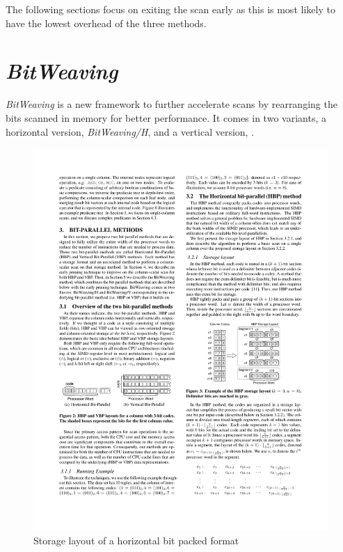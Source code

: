 The following sections focus on exiting the scan early as this is most likely to
have the lowest overhead of the three methods.

\section{\emph{BitWeaving}}

\emph{BitWeaving} \cite{BitWeaving} is a new framework to further accelerate
scans by rearranging the bits scanned in memory for better performance. It comes
in two variants, a horizontal version, \emph{BitWeaving/H}, and a vertical
version, \bwv{}.

\begin{figure}[h] \begin{center}
\includegraphics[scale=1.5]{images/bwh}
\end{center}
\caption{Storage layout of a horizontal bit packed format~\cite{BitWeaving}}
\label{fig:bwh}
\end{figure}

